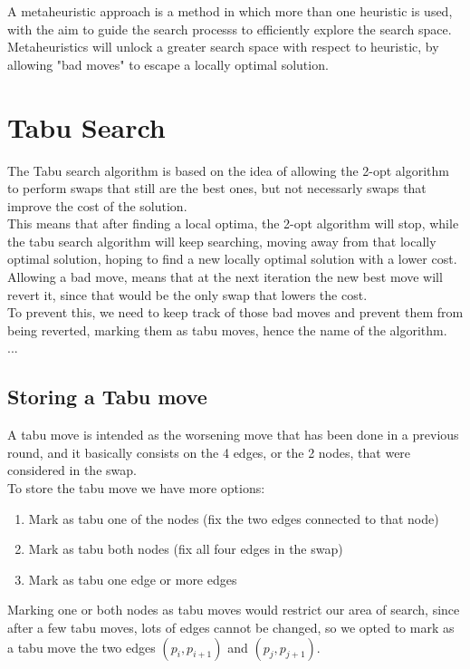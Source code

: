 A metaheuristic approach is a method in which more than one heuristic is used, with the aim to guide the search processs to efficiently explore the search space.\\
Metaheuristics will unlock a greater search space with respect to heuristic, by allowing "bad moves" to escape a locally optimal solution.

\section{Tabu Search}
The Tabu search algorithm is based on the idea of allowing the 2-opt algorithm to perform swaps that still are the best ones, but not necessarly swaps that improve the cost of the solution.\\
This means that after finding a local optima, the 2-opt algorithm will stop, while the tabu search algorithm will keep searching, moving away from that locally optimal solution, hoping to find a new locally optimal solution with a lower cost.\\
Allowing a bad move, means that at the next iteration the new best move will revert it, since that would be the only swap that lowers the cost.\\
To prevent this, we need to keep track of those bad moves and prevent them from being reverted, marking them as tabu moves, hence the name of the algorithm.\\

...
\subsection{Storing a Tabu move}
A tabu move is intended as the worsening move that has been done in a previous round, and it basically consists on the 4 edges, or the 2 nodes, that were considered in the swap.\\
To store the tabu move we have more options:
\begin{enumerate}
    \item Mark as tabu one of the nodes (fix the two edges connected to that node)
    \item Mark as tabu both nodes (fix all four edges in the swap)
    \item Mark as tabu one edge or more edges
\end{enumerate}
Marking one or both nodes as tabu moves would restrict our area of search, since after a few tabu moves, lots of edges cannot be changed, so we opted to mark as a tabu move the two edges $(p_{i},p_{i+1})$ and $(p_{j}, p_{j+1})$.

